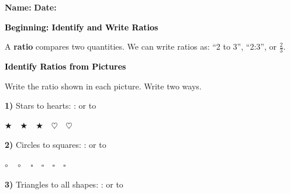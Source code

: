 \documentclass[12pt, letterpaper, fleqn]{article}
\newcommand{\blank}{\underline{\hspace{2.2cm}}}
\newcommand{\blankshorter}{\underline{\hspace{1.5cm}}}
\begin{document}
\textbf{Name:} \underline{\hspace{5cm}}
\hfill
\textbf{Date:} \underline{\hspace{3cm}}\\

\begin{tcolorbox}[colback=customteal!20]
    \large\textcolor{black}{\textbf{Beginning: Identify and Write Ratios}}
\end{tcolorbox}

\vspace{3mm}

\noindent
A \textbf{ratio} compares two quantities. We can write ratios as: ``2 to 3'', ``2:3'', or $\frac{2}{3}$.

\vspace{4mm}

\begin{tcolorbox}[colback=customteal!20]
\large\textcolor{black}{\textbf{Identify Ratios from Pictures}}
\end{tcolorbox}

\noindent
Write the ratio shown in each picture. Write two ways.

\vspace{3mm}

\noindent
\textbf{1)} Stars to hearts: \blank : \blank \quad or \quad \blankshorter \quad to \blankshorter

\begin{center}
$\bigstar \quad \bigstar \quad \bigstar \quad \heartsuit \quad \heartsuit$
\end{center}

\vspace{2mm}

\noindent
\textbf{2)} Circles to squares: \blank : \blank \quad or \quad \blankshorter \quad to \blankshorter

\begin{center}
$\circ \quad \circ \quad \square \quad \square \quad \square \quad \square$
\end{center}

\vspace{2mm}

\noindent
\textbf{3)} Triangles to all shapes: \blank : \blank \quad or \quad \blankshorter \quad to \blankshorter
\end{document}
